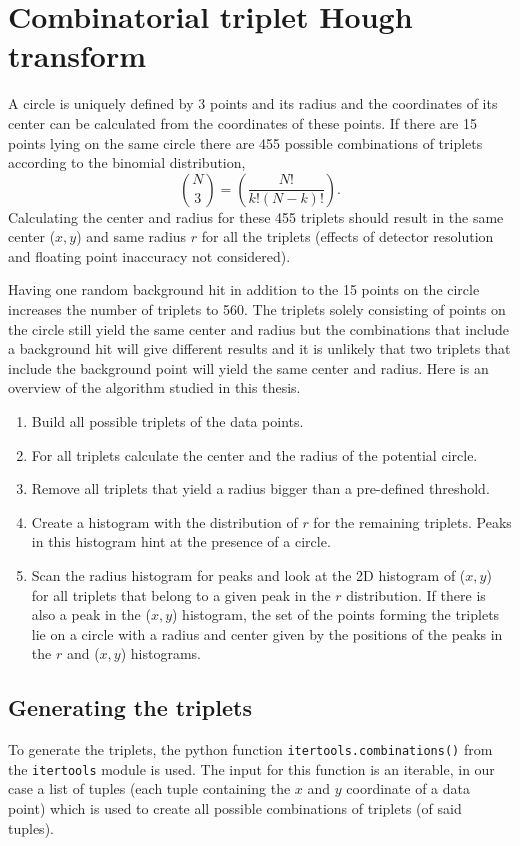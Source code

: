 \documentclass[11pt]{scrreprt}
\begin{document}
\section{Combinatorial triplet Hough transform}
\label{sec:combinatorial_approach}
A circle is uniquely defined by 3 points and its radius and the coordinates of its center can be calculated from the coordinates of these points. If there are 
15 points lying on the same circle there are 455 possible combinations of triplets according to the binomial distribution,
\[
   \binom{N}{3} = \left(\frac{N!}{k!(N-k)!}\right).
 \]
Calculating the center and radius for these 455 triplets should result in the same center ($x,y$) and same radius $r$ for all the triplets 
(effects of detector resolution and floating point inaccuracy not considered). 

Having one random background hit in addition to the 15 points on the circle increases the number of triplets to 560. The triplets 
solely consisting of points on the circle still yield the same center and radius but the combinations that include a background hit will 
give different results and it is unlikely that two triplets that include the background point will yield the same center and radius. 
Here is an overview of the algorithm studied in this thesis.

\begin{enumerate}
\item Build all possible triplets of the data points.
\item For all triplets calculate the center and the radius of the potential circle.
\item Remove all triplets that yield a radius bigger than a pre-defined threshold.
\item Create a histogram with the distribution of $r$ for the remaining triplets. Peaks in this histogram hint at the presence of a circle.
\item Scan the radius histogram for peaks and look at the 2D histogram of ($x,y$) for all triplets that belong to a given peak in the 
$r$ distribution. If there is also a peak in the ($x,y$) histogram, the set of the points forming the triplets lie on a circle with a 
radius and center given by the positions of the peaks in the $r$ and ($x,y$) histograms.
\end{enumerate}

\subsection{Generating the triplets} %
\label{sub:generating_the_triples}
To generate the triplets, the python function \texttt{itertools.combinations()} from the \texttt{itertools} module is used. The input 
for this function is an iterable, in our case a list of tuples (each tuple containing the $x$ and $y$ coordinate of a data point) which is 
used to create all possible combinations of triplets (of said tuples).
\end{document}
